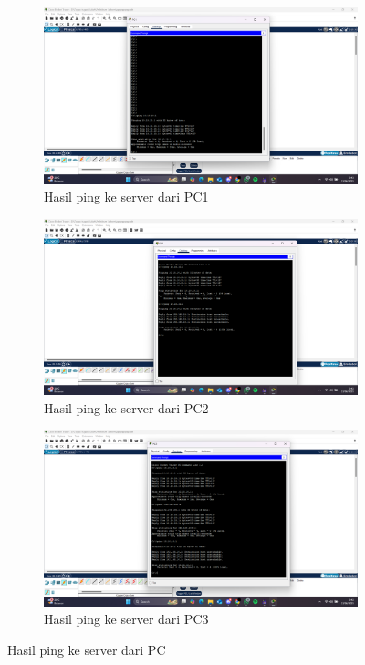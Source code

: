 \begin{figure}[H]
	\centering
	\begin{subfigure}[b]{0.4\linewidth}
		\centering
		\includegraphics[width=\linewidth]{P4/img/tumod (10).png}
		\caption{Hasil ping ke server dari PC1\label{fig:konfigurasiR1}}
	\end{subfigure}
	\begin{subfigure}[b]{0.4\linewidth}
		\centering
		\includegraphics[width=\linewidth]{P4/img/tumod (9).png}
		\caption{Hasil ping ke server dari PC2\label{fig:konfigurasiR2}}
	\end{subfigure}
	\begin{subfigure}[b]{0.4\linewidth}
		\centering
		\includegraphics[width=\linewidth]{P4/img/tumod (8).png}
		\caption{Hasil ping ke server dari PC3\label{fig:konfigurasiR2}}
	\end{subfigure}
	\caption{Hasil ping ke server dari PC}
	\hspace{1cm}
\end{figure}

